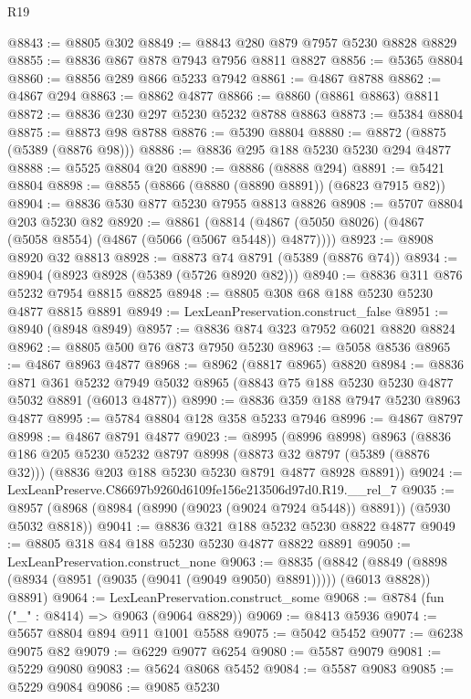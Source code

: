 \begin{lexlean}{R19}
\begin{coremodule}
@8843 := @8805 @302
@8849 := @8843 @280 @879 @7957 @5230 @8828 @8829
@8855 := @8836 @867 @878 @7943 @7956 @8811 @8827
@8856 := @5365 @8804
@8860 := @8856 @289 @866 @5233 @7942
@8861 := @4867 @8788
@8862 := @4867 @294
@8863 := @8862 @4877
@8866 := @8860 (@8861 @8863) @8811
@8872 := @8836 @230 @297 @5230 @5232 @8788 @8863
@8873 := @5384 @8804
@8875 := @8873 @98 @8788
@8876 := @5390 @8804
@8880 := @8872 (@8875 (@5389 (@8876 @98)))
@8886 := @8836 @295 @188 @5230 @5230 @294 @4877
@8888 := @5525 @8804 @20
@8890 := @8886 (@8888 @294)
@8891 := @5421 @8804
@8898 := @8855 (@8866 (@8880 (@8890 @8891)) (@6823 @7915 @82))
@8904 := @8836 @530 @877 @5230 @7955 @8813 @8826
@8908 := @5707 @8804 @203 @5230 @82
@8920 := @8861
    (@8814 (@4867 (@5050 @8026) (@4867 (@5058 @8554) (@4867 (@5066 (@5067 @5448)) @4877))))
@8923 := @8908 @8920 @32 @8813
@8928 := @8873 @74 @8791 (@5389 (@8876 @74))
@8934 := @8904 (@8923 @8928 (@5389 (@5726 @8920 @82)))
@8940 := @8836 @311 @876 @5232 @7954 @8815 @8825
@8948 := @8805 @308 @68 @188 @5230 @5230 @4877 @8815 @8891
@8949 := LexLeanPreservation.construct_false
@8951 := @8940 (@8948 @8949)
@8957 := @8836 @874 @323 @7952 @6021 @8820 @8824
@8962 := @8805 @500 @76 @873 @7950 @5230
@8963 := @5058 @8536
@8965 := @4867 @8963 @4877
@8968 := @8962 (@8817 @8965) @8820
@8984 := @8836
    @871
    @361
    @5232
    @7949
    @5032
    @8965
    (@8843 @75 @188 @5230 @5230 @4877 @5032 @8891 (@6013 @4877))
@8990 := @8836 @359 @188 @7947 @5230 @8963 @4877
@8995 := @5784 @8804 @128 @358 @5233 @7946
@8996 := @4867 @8797
@8998 := @4867 @8791 @4877
@9023 := @8995
    (@8996 @8998)
    @8963
    (@8836
      @186
      @205
      @5230
      @5232
      @8797
      @8998
      (@8873 @32 @8797 (@5389 (@8876 @32)))
      (@8836 @203 @188 @5230 @5230 @8791 @4877 @8928 @8891))
@9024 := LexLeanPreserve.C86697b9260d6109fe156e213506d97d0.R19.__rel_7
@9035 := @8957 (@8968 (@8984 (@8990 (@9023 (@9024 @7924 @5448)) @8891)) (@5930 @5032 @8818))
@9041 := @8836 @321 @188 @5232 @5230 @8822 @4877
@9049 := @8805 @318 @84 @188 @5230 @5230 @4877 @8822 @8891
@9050 := LexLeanPreservation.construct_none
@9063 := @8835
    (@8842 (@8849 (@8898 (@8934 (@8951 (@9035 (@9041 (@9049 @9050) @8891))))) (@6013 @8828)) @8891)
@9064 := LexLeanPreservation.construct_some
@9068 := @8784 (fun ("_" : @8414) => @9063 (@9064 @8829))
@9069 := @8413 @5936
@9074 := @5657 @8804 @894 @911 @1001 @5588
@9075 := @5042 @5452
@9077 := @6238 @9075 @82
@9079 := @6229 @9077 @6254
@9080 := @5587 @9079
@9081 := @5229 @9080
@9083 := @5624 @8068 @5452
@9084 := @5587 @9083
@9085 := @5229 @9084
@9086 := @9085 @5230

\end{coremodule}
\end{lexlean}
